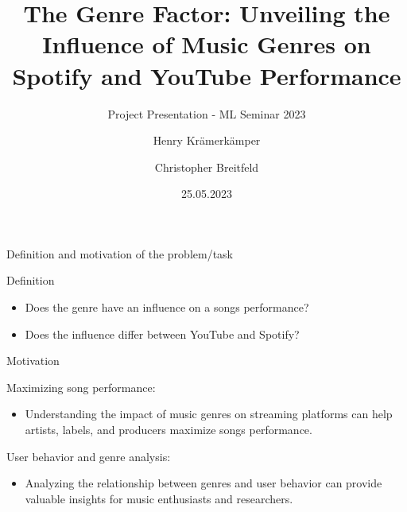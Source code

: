 \documentclass[8pt]{beamer}
\title{The Genre Factor: Unveiling the Influence of Music Genres on Spotify and YouTube Performance}
\subtitle{Project Presentation - ML Seminar 2023}
\author{Henry Krämerkämper\\%
  \and%
  Christopher Breitfeld}
\institute{Technische Universität Dortmund}
\date{25.05.2023}
\begin{document}
\begin{frame}
  \titlepage
\end{frame}

\begin{frame}{Definition and motivation of the problem/task}
  \begin{alertblock}{Definition}
    \begin{itemize}
      \item Does the genre have an influence on a songs performance?
      \item Does the influence differ between YouTube and Spotify?
    \end{itemize}
  \end{alertblock}
  \begin{alertblock}{Motivation}
    \begin{block}{Maximizing song performance:}
      \begin{itemize}
        \item{Understanding the impact of music genres on streaming platforms can help artists, labels, and producers maximize songs performance.}
      \end{itemize}
    \end{block}
    \begin{block}{User behavior and genre analysis:}
      \begin{itemize}
       \item{Analyzing the relationship between genres and user behavior can provide valuable insights for music enthusiasts and researchers.}
      \end{itemize}
    \end{block}
  \end{alertblock}
\end{frame}
\end{document}
